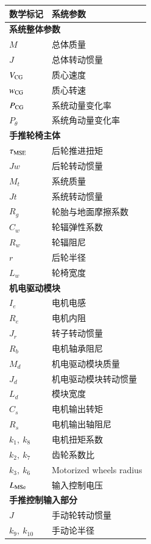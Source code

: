 \begin{table}[H]
\caption{系统主要参数及其数学标记}\label{tab:param}
\begin{longtable}{l|l}
	\toprule
	\textbf{数学标记} & \textbf{系统参数}\\
	\midrule
	\endhead
	\multicolumn{2}{l}{\textbf{系统整体参数}} \\ %
	\midrule
	$ M $ & 总体质量\\
	$ J $ & 总体转动惯量\\
	$ V_{\rm{CG}} $ & 质心速度\\
	$ w_{\rm{CG}} $ & 质心转速\\
	$ P_{\rm{CG}} $ & 系统动量变化率\\
	$ P_{\theta} $ & 系统角动量变化率\\
	\midrule
	\multicolumn{2}{l}{\textbf{手推轮椅主体}} \\
	\midrule
	$ \tau_{\rm{MSE}} $ & 后轮推进扭矩 \\
	$J w$ & 后轮转动惯量\\
	$ M_t $ & 系统质量\\
	$J t$ & 系统转动惯量\\
	$R_g$ & 轮胎与地面摩擦系数\\
	$ C_w $ & 轮辐弹性系数\\
	$R_w$ & 轮辐阻尼\\
	$ r $ & 后轮半径\\
	$ L_w $ & 轮椅宽度\\
	\midrule
	\multicolumn{2}{l}{\textbf{机电驱动模块}} \\
	\midrule
	$ I_e $ & 电机电感\\
	$ R_e $ & 电机内阻\\
	$ J_r $ & 转子转动惯量\\
	$ R_b $ & 电机轴承阻尼\\
	$ M_d $ & 机电驱动模块质量\\
	$ J_d $ & 机电驱动模块转动惯量\\
	$ L_d $ & 模块宽度\\
	$C_s $ & 电机输出转矩\\
	$ R_s $ & 电机输出轴阻尼\\
	$ k_1,\ k_8 $ & 电机扭矩系数\\
	$ k_2,\ k_7 $ & 齿轮系数比\\
	$ k_3,\ k_6 $ & {\color{blue}Motorized wheels radius} \\
	$ L_{\rm{MSe}} $ & 输入控制电压\\
	\midrule
	\multicolumn{2}{l}{\textbf{手推控制输入部分}}\\
	\midrule
	$ J $ & 手动轮转动惯量\\
	$ k_9,\ k_{10} $ & 手动论半径\\
	\bottomrule
\end{longtable}
\end{table}
